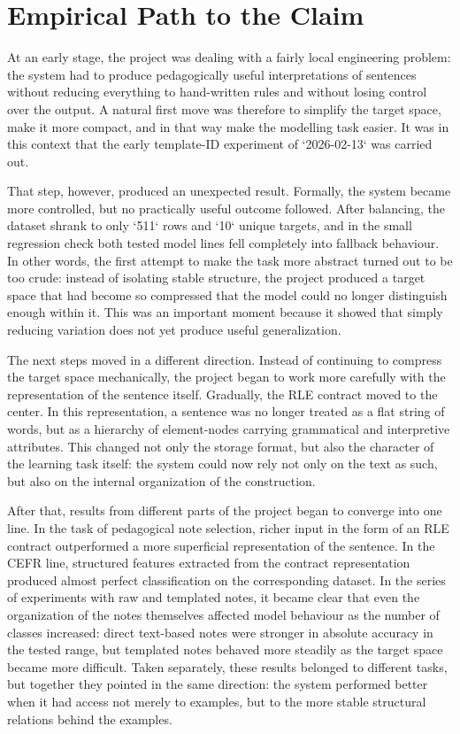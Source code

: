 \documentclass[12pt,a4paper,oneside]{report}
\begin{document}
\section{Empirical Path to the Claim}

At an early stage, the project was dealing with a fairly local engineering problem: the system had to produce pedagogically useful interpretations of sentences without reducing everything to hand-written rules and without losing control over the output. A natural first move was therefore to simplify the target space, make it more compact, and in that way make the modelling task easier. It was in this context that the early template-ID experiment of `2026-02-13` was carried out.

That step, however, produced an unexpected result. Formally, the system became more controlled, but no practically useful outcome followed. After balancing, the dataset shrank to only `511` rows and `10` unique targets, and in the small regression check both tested model lines fell completely into fallback behaviour. In other words, the first attempt to make the task more abstract turned out to be too crude: instead of isolating stable structure, the project produced a target space that had become so compressed that the model could no longer distinguish enough within it. This was an important moment because it showed that simply reducing variation does not yet produce useful generalization.

The next steps moved in a different direction. Instead of continuing to compress the target space mechanically, the project began to work more carefully with the representation of the sentence itself. Gradually, the RLE contract moved to the center. In this representation, a sentence was no longer treated as a flat string of words, but as a hierarchy of element-nodes carrying grammatical and interpretive attributes. This changed not only the storage format, but also the character of the learning task itself: the system could now rely not only on the text as such, but also on the internal organization of the construction.

After that, results from different parts of the project began to converge into one line. In the task of pedagogical note selection, richer input in the form of an RLE contract outperformed a more superficial representation of the sentence. In the CEFR line, structured features extracted from the contract representation produced almost perfect classification on the corresponding dataset. In the series of experiments with raw and templated notes, it became clear that even the organization of the notes themselves affected model behaviour as the number of classes increased: direct text-based notes were stronger in absolute accuracy in the tested range, but templated notes behaved more steadily as the target space became more difficult. Taken separately, these results belonged to different tasks, but together they pointed in the same direction: the system performed better when it had access not merely to examples, but to the more stable structural relations behind the examples.
\end{document}
